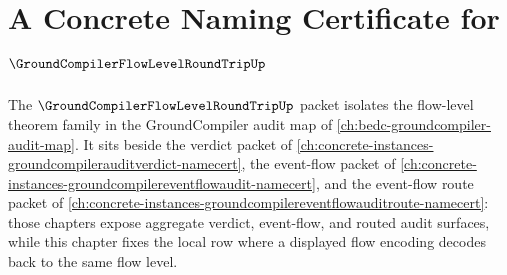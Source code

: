 \chapter{A Concrete Naming Certificate for $\GroundCompilerFlowLevelRoundTripUp$}
\label{ch:concrete-instances-groundcompilerflowlevelroundtrip-namecert}

The $\GroundCompilerFlowLevelRoundTripUp$ packet isolates the flow-level theorem family in the GroundCompiler audit map of \autoref{ch:bedc-groundcompiler-audit-map}. It sits beside the verdict packet of \autoref{ch:concrete-instances-groundcompilerauditverdict-namecert}, the event-flow packet of \autoref{ch:concrete-instances-groundcompilereventflowaudit-namecert}, and the event-flow route packet of \autoref{ch:concrete-instances-groundcompilereventflowauditroute-namecert}: those chapters expose aggregate verdict, event-flow, and routed audit surfaces, while this chapter fixes the local row where a displayed flow encoding decodes back to the same flow level.

